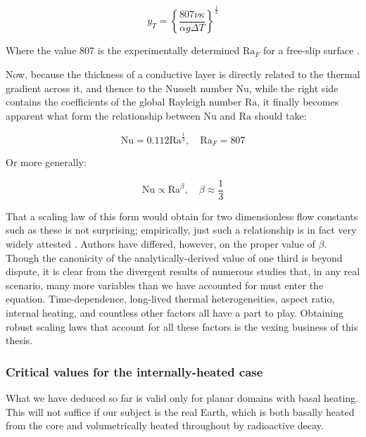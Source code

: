 \documentclass[a4paper,11pt,oneside]{book}
\begin{document}
\begin{equation}
y_T = \left\{ \frac{807 \nu \kappa}{\alpha g \Delta T} \right\} ^{\frac{1}{3}}
\end{equation}

Where the value 807 is the experimentally determined $\mathrm{Ra}_F$ for a free-slip surface \cite{Jaupart1985-ig}.

Now, because the thickness of a conductive layer is directly related to the thermal gradient across it, and thence to the Nusselt number $\mathrm{Nu}$, while the right side contains the coefficients of the global Rayleigh number $\mathrm{Ra}$, it finally becomes apparent what form the relationship between $\mathrm{Nu}$ and $\mathrm{Ra}$ should take:

\begin{equation}
\mathrm{Nu} = 0.112 \mathrm{Ra}^{\frac{1}{3}}, \quad \mathrm{Ra}_F = 807
\end{equation}

Or more generally:

\begin{equation}
\mathrm{Nu} \propto \mathrm{Ra}^\beta, \quad \beta \approx \frac{1}{3}
\end{equation}

That a scaling law of this form would obtain for two dimensionless flow constants such as these is not surprising; empirically, just such a relationship is in fact very widely attested \citet{Turcotte1969-ol, McKenzie1974-wb, Solomatov1995-is}. Authors have differed, however, on the proper value of $\beta$. Though the canonicity of the analytically-derived value of one third is beyond dispute, it is clear from the divergent results of numerous studies that, in any real scenario, many more variables than we have accounted for must enter the equation. Time-dependence, long-lived thermal heterogeneities, aspect ratio, internal heating, and countless other factors all have a part to play. Obtaining robust scaling laws that account for all these factors is the vexing business of this thesis.

\subsubsection{Critical values for the internally-heated case}

What we have deduced so far is valid only for planar domains with basal heating. This will not suffice if our subject is the real Earth, which is both basally heated from the core and volumetrically heated throughout by radioactive decay.
\end{document}
